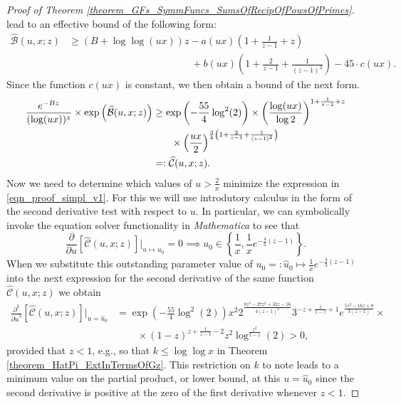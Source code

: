 \documentclass[11pt,reqno,a4letter]{article}
\numberwithin{figure}{section}
\numberwithin{table}{section}
\theoremstyle{plain}
\numberwithin{theorem}{section}
\theoremstyle{definition}
\begin{document}
\begin{proof}[Proof of Theorem \ref{theorem_GFs_SymmFuncs_SumsOfRecipOfPowsOfPrimes}]
lead to an effective bound of the following form: 
\begin{align*} 
\widehat{\mathcal{B}}(u, x; z) & \geq (B + \log\log (ux)) z - a(ux) \left(1 + \frac{1}{z-1} + z\right) \\ 
     & \phantom{= (B + \log\log (ux)) z\ } + 
     b(ux) \left( 
     1 + \frac{2}{z-1} + \frac{1}{(z-1)^2}\right) - 
     45 \cdot c(ux). 
\end{align*} 
Since the function $c(ux)$ is constant, we then obtain a bound of the next form. 
\begin{align} 
\notag 
\frac{e^{-Bz}}{(\log (ux))^{z}} \times \exp\left(\widehat{\mathcal{B}}(u, x; z)\right) & \geq 
    \exp\left(-\frac{55}{4} \log^2(2)\right) \times \left(\frac{\log(ux)}{\log 2}\right)^{1 + \frac{1}{z-1} + z} \\ 
\notag 
    & \phantom{\geq \times} \times \left(\frac{ux}{2}\right)^{\frac{3}{4}\left(1 + \frac{2}{z-1} + \frac{1}{(z-1)^2}\right)} \\ 
\label{eqn_proof_simpl_v1} 
     & =: \widehat{\mathcal{C}}(u, x; z). 
\end{align} 
Now we need to determine which values of $u > \frac{2}{x}$ minimize the expression in \eqref{eqn_proof_simpl_v1}. 
For this we will use introdutory calculus in the form of the second derivative test with respect to $u$. 
In particular, we can symbolically invoke the equation solver functionality in \emph{Mathematica} 
to see that 
\[
\frac{\partial}{\partial u}\left[\widehat{\mathcal{C}}(u, x; z)\right] \Biggr\rvert_{u \mapsto u_0} = 0 \implies 
     u_0 \in \left\{\frac{1}{x}, \frac{1}{x} e^{-\frac{4}{3}(z-1)}\right\}. 
\]
When we substitute this outstanding parameter value of $u_0 =: \hat{u}_0 \mapsto \frac{1}{x} e^{-\frac{4}{3}(z-1)}$ 
into the next expression for the second derivative of the same function 
$\widehat{\mathcal{C}}(u, x; z)$ we obtain 
\begin{align*} 
\frac{\partial^2}{{\partial u}^2}\left[\widehat{\mathcal{C}}(u, x; z)\right] \Biggr\rvert_{u = \hat{u}_0} & = 
     \exp\left(-\frac{55}{4} \log^2(2)\right) x^2 2^{\frac{8 z^3-27 z^2+32 z-16}{4 (z-1)^2}} 
     3^{-z+\frac{1}{1-z}+1} e^{\frac{5 z^2-16 z+8}{3 (z-1)}} \times \\ 
     & \phantom{=\times} \times (1-z)^{z+\frac{1}{z-1}-2} z^2
     \log^{\frac{z^2}{1-z}}(2) > 0, 
\end{align*} 
provided that $z < 1$, e.g., so that $k \leq \log\log x$ in Theorem \ref{theorem_HatPi_ExtInTermsOfGz}. 
This restriction on $k$ to note 
leads to a minimum value on the partial product, or lower bound, at this $u = \hat{u}_0$ 
since the second derivative is positive at the zero of the first derivative whenever $z < 1$. 


\end{proof}
\end{document}
